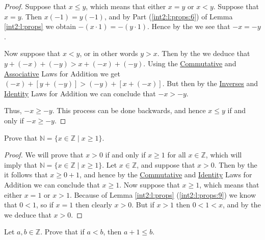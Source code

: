 \begin{proof}
	Suppose that $x \leq y$, which means that either $x = y$ or $x < y$. Suppose that $x = y$. Then $x(-1) = y(-1)$, and by Part (\ref{int2:l:props:6}) of Lemma \ref{int2:l:props} we obtain
	$-(x \cdot 1) = -(y \cdot 1)$. Hence by the  we see that $-x = -y$.

	Now suppose that $x < y$, or in other words $y > x$. Then by the  we deduce that $y + (-x) + (-y) > x + (-x) + (-y)$. Using the \hyperref[int2:d:oid:commutative_add]{Commutative} and \hyperref[int2:d:oid:associative_add]{Associative} Laws for Addition we get $(-x) + [y + (-y)] > (-y) + [x + (-x)]$. But then by the \hyperref[int2:d:oid:inverses_add]{Inverses} and \hyperref[int2:d:oid:identity_add]{Identity} Laws for Addition we can conclude that $-x > -y$.

	Thus, $-x \geq -y$. This process can be done backwards, and hence $x \leq y$ if and only if $-x \geq -y$.
\end{proof}

\Newpage
\begin{exercise} %
	\label{int2:e:4}
	Prove that $\mathbb{N} = \{ x \in \mathbb{Z} \mid x \geq 1 \}$.
\end{exercise}

\begin{proof}
	We will prove that $x > 0$ if and only if $x \geq 1$ for all $x \in \mathbb{Z}$, which will imply that $\mathbb{N} = \{ x \in \mathbb{Z} \mid x \geq 1 \}$. Let $x \in \mathbb{Z}$, and suppose that $x > 0$. Then by the  it follows that $x \geq 0 + 1$, and hence by the \hyperref[int2:d:oid:commutative_add]{Commutative} and \hyperref[int2:d:oid:identity_add]{Identity} Laws for Addition we can conclude that $x \geq 1$. Now suppose that $x \geq 1$, which means that either $x = 1$ or $x > 1$. Because of Lemma \ref{int2:l:props} (\ref{int2:l:props:9}) we know that $0 < 1$, so if $x = 1$ then clearly $x > 0$. But if $x > 1$ then $0 < 1 < x$, and by the  we deduce that $x > 0$.

\end{proof}

\Newpage
\begin{exercise} %
	Let $a, b \in \mathbb{Z}$. Prove that if $a < b$, then $a + 1 \leq b$.
\end{exercise}

